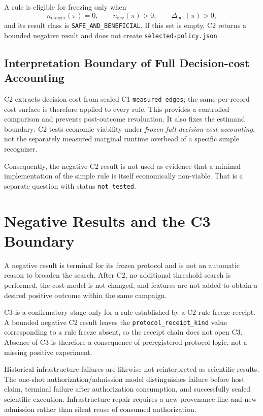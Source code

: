 A rule is eligible for freezing only when
\[
  n_{\mathrm{danger}}(\pi)=0,\qquad
  n_{\mathrm{acc}}(\pi)>0,\qquad
  \Delta_{\mathrm{net}}(\pi)>0,
\]
and its result class is \texttt{SAFE\_AND\_BENEFICIAL}. If this set is empty, C2
returns a bounded negative result and does not create \texttt{selected-policy.json}.

\subsection{Interpretation Boundary of Full Decision-cost Accounting}

C2 extracts decision cost from sealed C1 \texttt{measured\_edges}; the same per-record
cost surface is therefore applied to every rule. This provides a controlled comparison
and prevents post-outcome revaluation. It also fixes the estimand boundary: C2 tests
economic viability under \emph{frozen full decision-cost accounting}, not the
separately measured marginal runtime overhead of a specific simple recognizer.

Consequently, the negative C2 result is not used as evidence that a minimal
implementation of the simple rule is itself economically non-viable. That is a
separate question with status \texttt{not\_tested}.

\section{Negative Results and the C3 Boundary}
\label{sec:method-negative-en}

A negative result is terminal for its frozen protocol and is not an automatic reason
to broaden the search. After C2, no additional threshold search is performed, the cost
model is not changed, and features are not added to obtain a desired positive outcome
within the same campaign.

C3 is a confirmatory stage only for a rule established by a C2 rule-freeze receipt. A
bounded negative C2 result leaves the \texttt{protocol\_receipt\_kind} value
corresponding to a rule freeze absent, so the receipt chain does not open C3. Absence of
C3 is therefore a consequence of preregistered protocol logic, not a missing positive
experiment.

Historical infrastructure failures are likewise not reinterpreted as scientific
results. The one-shot authorization/admission model distinguishes failure before host
claim, terminal failure after authorization consumption, and successfully sealed
scientific execution. Infrastructure repair requires a new provenance line and new
admission rather than silent reuse of consumed authorization.

